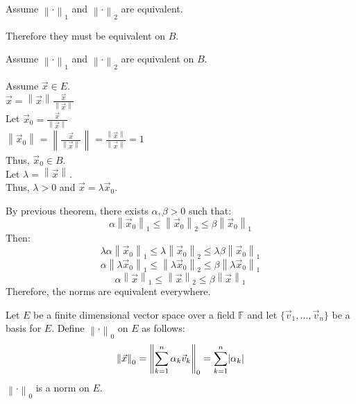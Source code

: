\documentclass[letterpaper,12pt,fleqn]{article}
\newcommand{\nnorm}[2]{\left\|#1\right\|_{#2}}
\newcommand{\norm}[1]{\nnorm{#1}{}}
\newcommand{\vv}{\vec{v}}
\newcommand{\vx}{\vec{x}}
\newcommand{\F}{\mathbb{F}}
\renewcommand{\a}{\alpha}
\renewcommand{\b}{\beta}
\renewcommand{\l}{\lambda}
\begin{document}
\begin{theproof}
  \listbreak
  \begin{description}
  \item Assume $\nnorm{\cdot}{1}$ and $\nnorm{\cdot}{2}$ are equivalent.

    Therefore they must be equivalent on $B$.

  \item Assume $\nnorm{\cdot}{1}$ and $\nnorm{\cdot}{2}$ are equivalent on $B$.

    Assume $\vx\in E$. \\
    $\vx=\norm{\vx}\frac{\vx}{\norm{\vx}}$ \\
    Let $\vx_0=\frac{\vx}{\norm{\vx}}$ \\
    $\norm{\vx_0}=\norm{\frac{\vx}{\norm{\vx}}}=
    \frac{\norm{\vx}}{\norm{\vx}}=1$ \\
    Thus, $\vx_0\in B$. \\
    Let $\l=\norm{\vx}$. \\
    Thus, $\l>0$ and $\vx=\l\vx_0$.
    
    By previous theorem, there exists $\a,\b>0$ such that:
    \[\a\nnorm{\vx_0}{1}\le\nnorm{\vx_0}{2}\le\b\nnorm{\vx_0}{1}\]
    Then:
    \[\l\a\nnorm{\vx_0}{1}\le\l\nnorm{\vx_0}{2}\le\l\b\nnorm{\vx_0}{1}\]
    \[\a\nnorm{\l\vx_0}{1}\le\nnorm{\l\vx_0}{2}\le\b\nnorm{\l\vx_0}{1}\]
    \[\a\nnorm{\vx}{1}\le\nnorm{\vx}{2}\le\b\nnorm{\vx}{1}\]
    Therefore, the norms are equivalent everywhere.
  \end{description}
\end{theproof}

\begin{theorem}
  Let $E$ be a finite dimensional vector space over a field $\F$ and let
  $\{\vv_1,\ldots,\vv_n\}$ be a basis for $E$. Define $\nnorm{\cdot}{0}$ on $E$
  as follows:
  \[\nnorm{\vx}{0}=\nnorm{\sum_{k=1}^n\a_k\vv_k}{0}=\sum_{k=1}^n\abs{\a_k}\]
  $\nnorm{\cdot}{0}$ is a norm on $E$.
\end{theorem}
\end{document}
